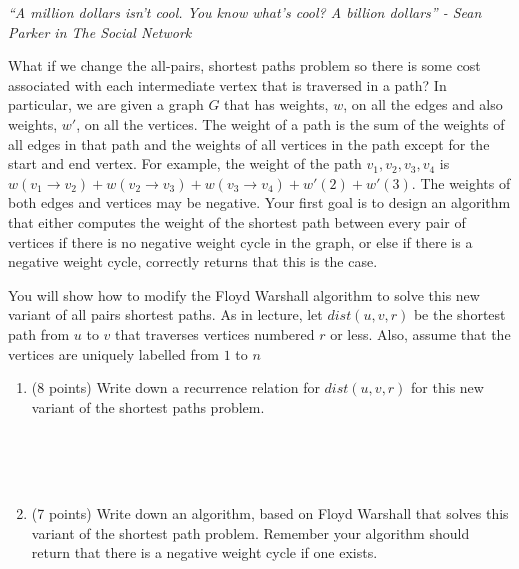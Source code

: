\documentclass[11pt]{article}
\begin{document}
\begin{enumerate}
\begin{enumerate}
\end{enumerate}

 
 
 \emph{``A million dollars isn't cool.  You know what's cool?  A billion dollars'' - Sean Parker in The Social Network}
 
What if we change the all-pairs, shortest paths problem so there is some cost associated with each intermediate vertex that is traversed in a path?  In particular, we are given a graph $G$ that has weights, $w$, on all the edges and also weights, $w'$, on all the vertices.  The weight of a path is the sum of the weights of all edges in that path and the weights of all vertices in the path except for the start and end vertex.  For example, the weight of the path $v_{1}, v_{2}, v_{3}, v_{4}$ is $w(v_{1} \rightarrow v_{2}) + w(v_{2} \rightarrow v_{3}) + w(v_{3} \rightarrow v_{4}) + w'(2) + w'(3)$.  The weights of both edges and vertices may be negative.  Your first goal is to design an algorithm that either computes the weight of the shortest path between every pair of vertices if there is no negative weight cycle in the graph, or else if there is a negative weight cycle, correctly returns that this is the case.

You will show how to modify the Floyd Warshall algorithm to solve this new variant of all pairs shortest paths.  As in lecture, let $dist(u,v,r)$ be the shortest path from $u$ to $v$ that traverses vertices numbered $r$ or less.  Also, assume that the vertices are uniquely labelled from $1$ to $n$

\begin{enumerate}
\item (8 points) Write down a recurrence relation for $dist(u,v,r)$ for this new variant of the shortest paths problem. 

  \ \\ \ \\ \ \\ 

\pagebreak

\item (7 points) Write down an algorithm, based on Floyd Warshall that solves this variant of the shortest path problem.  Remember your algorithm should return that there is a negative weight cycle if one exists.

\pagebreak


\end{enumerate}
\end{enumerate}
\end{document}
